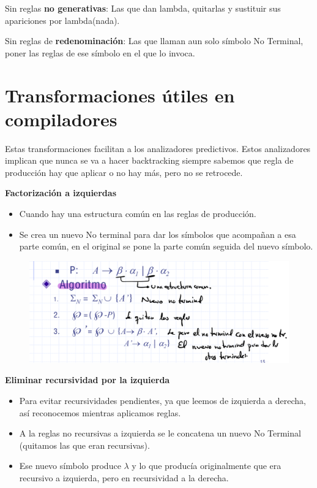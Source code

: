 \documentclass[12pt]{report} %
\begin{document}
Sin reglas \textbf{no generativas}: Las que dan lambda, quitarlas y
sustituir sus apariciones por lambda(nada).

Sin reglas de \textbf{redenominación}: Las que llaman aun solo símbolo
No Terminal, poner las reglas de ese símbolo en el que lo invoca.


\section{Transformaciones útiles en compiladores}

Estas transformaciones facilitan a los analizadores predictivos. Estos
analizadores implican que nunca se va a hacer backtracking siempre
sabemos que regla de producción hay que aplicar o no hay más, pero no se
retrocede.

\textbf{Factorización a izquierdas}

\begin{itemize}
\item
  Cuando hay una estructura común en las reglas de producción.
\item
  Se crea un nuevo No terminal para dar los símbolos que acompañan a esa
  parte común, en el original se pone la parte común seguida del nuevo
  símbolo.
\end{itemize}

\begin{figure}[H]
	{\includegraphics[scale=.3]{Untitled 1.png}}
\end{figure}

\textbf{Eliminar recursividad por la izquierda}

\begin{itemize}
\item
  Para evitar recursividades pendientes, ya que leemos de izquierda a
  derecha, así reconocemos mientras aplicamos reglas.
\item
  A la reglas no recursivas a izquierda se le concatena un nuevo No
  Terminal (quitamos las que eran recursivas).
\item
  Ese nuevo símbolo produce \(\lambda\) y lo que producía originalmente
  que era recursivo a izquierda, pero en recursividad a la derecha.
\end{itemize}
\end{document}
